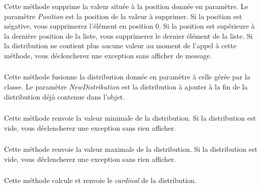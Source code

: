 \noindent Cette méthode supprime la valeur située à la position donnée en paramètre.
Le paramètre \textit{Position} est la position de la valeur à supprimer.
Si la position est négative, vous supprimerez l'élément en position $ 0 $.
Si la position est supérieure à la dernière position de la liste, vous supprimerez le dernier élément de la liste.
Si la distribution ne contient plus aucune valeur au moment de l'appel à cette méthode, vous déclencherez une exception  sans afficher de message.


\subsubsection*{}

\noindent Cette méthode fusionne la distribution donnée en paramètre à celle gérée par la classe.
Le paramètre \textit{NewDistribution} est la distribution à ajouter à la fin de la distribution déjà contenue dans l'objet.



\subsubsection*{}

\noindent Cette méthode renvoie la valeur minimale de la distribution.
Si la distribution est vide, vous déclencherez une exception  sans rien afficher.


\subsubsection*{}

\noindent Cette méthode renvoie la valeur maximale de la distribution.
Si la distribution est vide, vous déclencherez une exception  sans rien afficher.


\subsubsection*{}

\noindent Cette méthode calcule et renvoie le \textit{cardinal} de la distribution.


